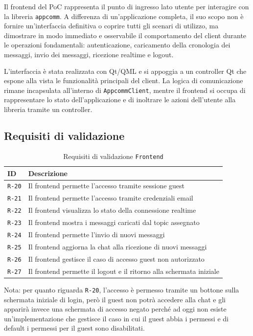 \documentclass[a4paper, 11pt, twoside]{report}
\begin{document}
Il frontend del PoC rappresenta il punto di ingresso lato utente per interagire con la libreria \texttt{appcomm}. A differenza di
un'applicazione completa, il suo scopo non è fornire un'interfaccia definitiva o coprire tutti gli scenari di utilizzo, ma dimostrare
in modo immediato e osservabile il comportamento del client durante le operazioni fondamentali: autenticazione, caricamento della
cronologia dei messaggi, invio dei messaggi, ricezione realtime e logout.

L'interfaccia è stata realizzata con Qt/QML e si appoggia a un controller Qt che espone alla vista le funzionalità principali del
client. La logica di comunicazione rimane incapsulata all'interno di \texttt{AppcommClient}, mentre il frontend si occupa di
rappresentare lo stato dell'applicazione e di inoltrare le azioni dell'utente alla libreria tramite un controller.

\subsection{Requisiti di validazione}

\begin{table}[h]
\centering
\begin{tabular}{@{}p{1.4cm}p{12cm}@{}}
\toprule
\textbf{ID} & \textbf{Descrizione} \\ \midrule
\texttt{R-20} & Il frontend permette l'accesso tramite sessione guest \\
\texttt{R-21} & Il frontend permette l'accesso tramite credenziali email \\
\texttt{R-22} & Il frontend visualizza lo stato della connessione realtime \\
\texttt{R-23} & Il frontend mostra i messaggi caricati dal topic assegnato \\
\texttt{R-24} & Il frontend permette l'invio di nuovi messaggi \\
\texttt{R-25} & Il frontend aggiorna la chat alla ricezione di nuovi messaggi \\
\texttt{R-26} & Il frontend gestisce il caso di accesso guest non autorizzato \\
\texttt{R-27} & Il frontend permette il logout e il ritorno alla schermata iniziale \\
\bottomrule
\end{tabular}
\caption{Requisiti di validazione \texttt{Frontend}}
\end{table}

Nota: per quanto riguarda \texttt{R-20}, l'accesso è permesso tramite un bottone sulla schermata iniziale di login, però il guest non potrà accedere alla chat e gli apparirà invece una schermata di accesso negato perché ad oggi non esiste  un'implementazione che gestisce il caso in cui il guest abbia i permessi e di default i permessi per il guest sono disabilitati.  
\end{document}
